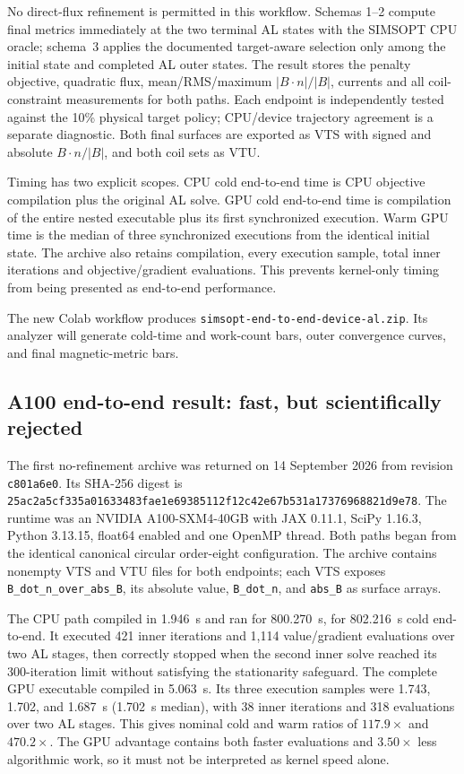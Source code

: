 \documentclass[11pt,a4paper]{article}
\newcommand{\code}[1]{\texttt{#1}}
\begin{document}
No direct-flux refinement is permitted in this workflow.  Schemas 1--2 compute
final metrics immediately at the two terminal AL states with the SIMSOPT CPU
oracle; schema~3 applies the documented target-aware selection only among the
initial state and completed AL outer states.  The
result stores the penalty objective, quadratic flux, mean/RMS/maximum
$|B\cdot n|/|B|$, currents and all coil-constraint measurements for both paths.
Each endpoint is independently tested against the 10\% physical target policy;
CPU/device trajectory agreement is a separate diagnostic.  Both final surfaces
are exported as VTS with signed and absolute $B\cdot n/|B|$, and both coil sets
as VTU.

Timing has two explicit scopes.  CPU cold end-to-end time is CPU objective
compilation plus the original AL solve.  GPU cold end-to-end time is compilation
of the entire nested executable plus its first synchronized execution.  Warm
GPU time is the median of three synchronized executions from the identical
initial state.  The archive also retains compilation, every execution sample,
total inner iterations and objective/gradient evaluations.  This prevents
kernel-only timing from being presented as end-to-end performance.

The new Colab workflow produces
\code{simsopt-end-to-end-device-al.zip}.  Its analyzer will generate cold-time
and work-count bars, outer convergence curves, and final magnetic-metric bars.

\subsection{A100 end-to-end result: fast, but scientifically rejected}

The first no-refinement archive was returned on 14 September 2026 from
revision \code{c801a6e0}.  Its SHA-256 digest is
\code{25ac2a5cf335a01633483fae1e69385112f12c42e67b531a17376968821d9e78}.
The runtime was an NVIDIA A100-SXM4-40GB with JAX 0.11.1, SciPy 1.16.3,
Python 3.13.15, float64 enabled and one OpenMP thread.  Both paths began from
the identical canonical circular order-eight configuration.  The archive
contains nonempty VTS and VTU files for both endpoints; each VTS exposes
\code{B\_dot\_n\_over\_abs\_B}, its absolute value, \code{B\_dot\_n}, and
\code{abs\_B} as surface arrays.

The CPU path compiled in 1.946~s and ran for 800.270~s, for 802.216~s cold
end-to-end.  It executed 421 inner iterations and 1,114 value/gradient
evaluations over two AL stages, then correctly stopped when the second inner
solve reached its 300-iteration limit without satisfying the stationarity
safeguard.  The complete GPU executable compiled in 5.063~s.  Its three
execution samples were 1.743, 1.702, and 1.687~s (1.702~s median), with 38
inner iterations and 318 evaluations over two AL stages.  This gives nominal
cold and warm ratios of $117.9\times$ and $470.2\times$.  The GPU advantage
contains both faster evaluations and $3.50\times$ less algorithmic work, so it
must not be interpreted as kernel speed alone.
\end{document}
